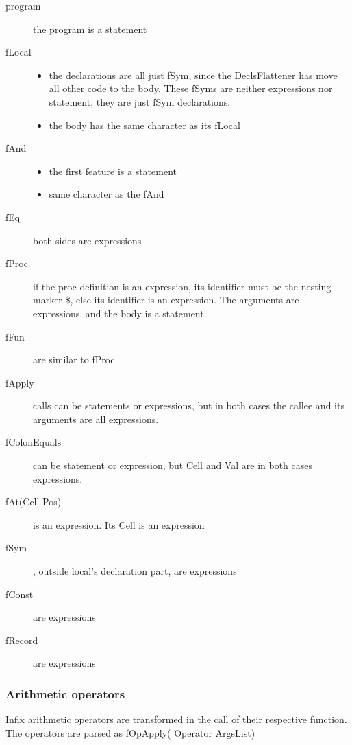 \documentclass[a4paper]{memoir}
\begin{document}
\begin{description}
  \item[program] the program is a statement
  \item[fLocal] 
    \begin{itemize}
      \item the declarations are all just fSym, since the DeclsFlattener has move all other code to the body. These fSyms are neither expressions nor statement, they are just fSym declarations.
      \item the body has the same character as its fLocal
    \end{itemize}
  \item[fAnd] 
    \begin{itemize}
      \item the first feature is a statement
      \item same character as the fAnd
    \end{itemize}
  \item[fEq] both sides are expressions
  \item[fProc] if the proc definition is an expression, its identifier must be the nesting marker \$, else its identifier is an expression. The arguments are expressions, and the body is a statement.
  \item[fFun] are similar to fProc
  \item[fApply] calls can be statements or expressions, but in both cases the callee and its arguments are all expressions. 
  \item[fColonEquals] can be statement or expression, but Cell and Val are in both cases expressions.
  \item[fAt(Cell Pos)] is an expression. Its Cell is an expression
  \item[fSym] , outside local's declaration part, are expressions
  \item[fConst] are expressions
  \item[fRecord] are expressions
\end{description}



\subsubsection{Arithmetic operators}
Infix arithmetic operators are transformed in the call of their respective function.
The operators are parsed as fOpApply( Operator ArgsList)
\end{document}
